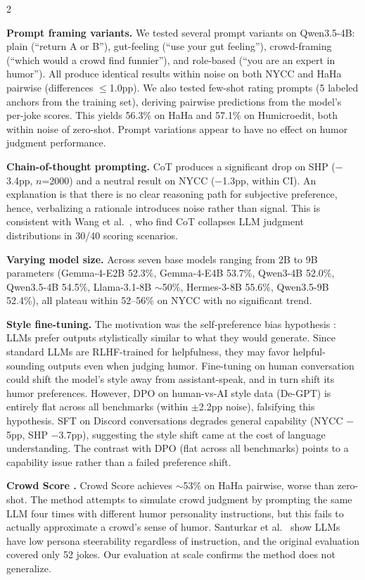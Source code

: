 \documentclass[10pt, a4paper]{article}
\begin{document}
\begin{multicols}{2}

\textbf{Prompt framing variants.} We tested several prompt variants on Qwen3.5-4B: plain (``return A or B''), gut-feeling (``use your gut feeling''), crowd-framing (``which would a crowd find funnier''), and role-based (``you are an expert in humor''). All produce identical results within noise on both NYCC and HaHa pairwise (differences $\leq$1.0pp). We also tested few-shot rating prompts (5 labeled anchors from the training set), deriving pairwise predictions from the model's per-joke scores. This yields 56.3\% on HaHa and 57.1\% on Humicroedit, both within noise of zero-shot. Prompt variations appear to have no effect on humor judgment performance.

\textbf{Chain-of-thought prompting.} CoT produces a significant drop on SHP ($-$3.4pp, $n$=2000) and a neutral result on NYCC ($-$1.3pp, within CI). An explanation is that there is no clear reasoning path for subjective preference, hence, verbalizing a rationale introduces noise rather than signal. This is consistent with Wang et al.\ \cite{wang2025}, who find CoT collapses LLM judgment distributions in 30/40 scoring scenarios.

\textbf{Varying model size.} Across seven base models ranging from 2B to 9B parameters (Gemma-4-E2B 52.3\%, Gemma-4-E4B 53.7\%, Qwen3-4B 52.0\%, Qwen3.5-4B 54.5\%, Llama-3.1-8B $\sim$50\%, Hermes-3-8B 55.6\%, Qwen3.5-9B 52.4\%), all plateau within 52--56\% on NYCC with no significant trend.

\textbf{Style fine-tuning.} The motivation was the self-preference bias hypothesis \cite{wataoka2024}: LLMs prefer outputs stylistically similar to what they would generate. Since standard LLMs are RLHF-trained for helpfulness, they may favor helpful-sounding outputs even when judging humor. Fine-tuning on human conversation could shift the model's style away from assistant-speak, and in turn shift its humor preferences. However, DPO on human-vs-AI style data (De-GPT) is entirely flat across all benchmarks (within $\pm$2.2pp noise), falsifying this hypothesis. SFT on Discord conversations degrades general capability (NYCC $-$5pp, SHP $-$3.7pp), suggesting the style shift came at the cost of language understanding. The contrast with DPO (flat across all benchmarks) points to a capability issue rather than a failed preference shift.

\textbf{Crowd Score \cite{goes2022}.} Crowd Score achieves $\sim$53\% on HaHa pairwise, worse than zero-shot. The method attempts to simulate crowd judgment by prompting the same LLM four times with different humor personality instructions, but this fails to actually approximate a crowd's sense of humor. Santurkar et al.\ \cite{santurkar2023} show LLMs have low persona steerability regardless of instruction, and the original evaluation covered only 52 jokes. Our evaluation at scale confirms the method does not generalize.


\end{multicols}
\end{document}
